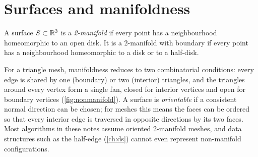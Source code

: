 \section{Surfaces and manifoldness}

\begin{definition}[2-manifold]
A surface $S\subset\mathbb{R}^3$ is a \emph{2-manifold} if every point has a neighbourhood homeomorphic to
an open disk. It is a 2-manifold with boundary if every point has a neighbourhood homeomorphic to
a disk or to a half-disk.
\end{definition}

For a triangle mesh, manifoldness reduces to two combinatorial conditions: every edge is shared by
one (boundary) or two (interior) triangles, and the triangles around every vertex form a single
fan, closed for interior vertices and open for boundary vertices (\cref{fig:nonmanifold}). A
surface is \emph{orientable} if a consistent normal direction can be chosen; for meshes this means
the faces can be ordered so that every interior edge is traversed in opposite directions by its two
faces. Most algorithms in these notes assume oriented 2-manifold meshes, and data structures such as
the half-edge (\cref{ch:ds}) cannot even represent non-manifold configurations.

